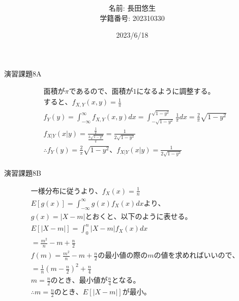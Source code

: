 \documentclass[dvipdfmx,uplatex]{jsarticle}
\title{
}
\author{
    名前: 長田悠生\\
    学籍番号: 202310330\\
}
\date{2023/6/18}
\begin{document}
  \begin{titlepage}
    \maketitle
    \begin{center}
      \textmc{\HUGE \LaTeX}
    \end{center}
    \thispagestyle{empty}
  \end{titlepage}

  \centerline{\huge 演習課題8A}
  \vspace{10mm}
  \begin{equation}
    \begin{aligned}
        &面積が \pi であるので、面積が1になるように調整する。\nonumber\\
        &すると、{f}_{X,Y}(x,y) = \frac{1}{\pi}\nonumber\\
        &f_{Y}(y) = \int_{-\infty}^{\infty} f_{X,Y}(x,y) dx = \int_{-\sqrt{1-y^2}}^{\sqrt{1-y^2}} \frac{1}{\pi} dx = \frac{2}{\pi}\sqrt{1-y^2}\nonumber\\
        &f_{X|Y}(x|y) = \frac{\frac{1}{\pi}}{\frac{2\sqrt{1-y^2}}{\pi}} = \frac{1}{2\sqrt{1-y^2}}\nonumber\\
        &\therefore f_{Y}(y) = \frac{2}{\pi}\sqrt{1-y^2}、f_{X|Y}(x|y) = \frac{1}{2\sqrt{1-y^2}}\nonumber\\
    \end{aligned}
  \end{equation}

  \vspace{10mm}
  \centerline{\huge 演習課題8B}
  \vspace{10mm}
  \begin{equation}
    \begin{aligned}
        &一様分布に従うより、f_{X}(x) = \frac{1}{n}\nonumber\\
        &E \left[ g(x) \right] = \int_{-\infty}^{\infty} g(x)f_{X}(x) dx より、\nonumber\\
        &g(x) = |X - m|とおくと、以下のように表せる。\nonumber\\
        &E \left[ |X - m| \right] = \int_{0}^{n}|X - m|f_{X}(x)dx\nonumber\\
        &=\frac{m^2}{n} -m + \frac{n}{2}\nonumber\\
        &f(m)=\frac{m^2}{n} -m + \frac{n}{2}の最小値の際のmの値を求めればいいので、\nonumber\\
        &=\frac{1}{n} \left( m - \frac{n}{2} \right)^2 + \frac{n}{4}\nonumber\\
        &m=\frac{n}{2}のとき、最小値が\frac{n}{4}となる。\nonumber\\
        &\therefore m=\frac{n}{2}のとき、E \left[ |X - m| \right]が最小。\nonumber\\
    \end{aligned}
  \end{equation}
\end{document}
